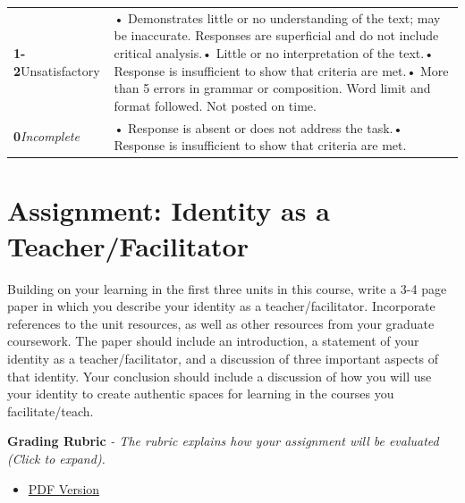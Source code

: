 \documentclass[
]{book}
\providecommand{\tightlist}{%
  \setlength{\itemsep}{0pt}\setlength{\parskip}{0pt}}
\begin{document}
\begin{longtable}[]{@{}
  >{\raggedright\arraybackslash}p{}
  >{\raggedright\arraybackslash}p{}@{}}
\textbf{1-2}Unsatisfactory & • Demonstrates little or no understanding of the text; may be inaccurate. Responses are superficial and do not include critical analysis.• Little or no interpretation of the text.• Response is insufficient to show that criteria are met.• More than 5 errors in grammar or composition. Word limit and format followed. Not posted on time. \\
\textbf{0}\emph{Incomplete} & • Response is absent or does not address the task.• Response is insufficient to show that criteria are met. \\
\bottomrule()
\end{longtable}

\hypertarget{assignment-identity-as-a-teacherfacilitator}{%
\section*{Assignment: Identity as a Teacher/Facilitator}\label{assignment-identity-as-a-teacherfacilitator}}

\begin{assessment}
Building on your learning in the first three units in this course, write
a 3-4 page paper in which you describe your identity as a
teacher/facilitator. Incorporate references to the unit resources, as
well as other resources from your graduate coursework. The paper should
include an introduction, a statement of your identity as a
teacher/facilitator, and a discussion of three important aspects of that
identity. Your conclusion should include a discussion of how you will
use your identity to create authentic spaces for learning in the courses
you facilitate/teach.
\end{assessment}

\textbf{Grading Rubric} \emph{- The rubric explains how your assignment will be evaluated (Click to expand).}

\begin{itemize}
\tightlist
\item
  \href{assets/assessment/Identity-as-a-Teacher-RUBRIC.pdf}{PDF Version}
\end{itemize}
\end{document}

